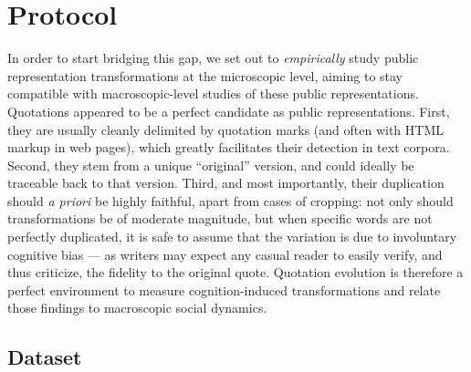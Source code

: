 \section{Protocol} %
\label{sec:protocol}

In order to start bridging this gap, we set out to \emph{empirically} study public representation transformations at the microscopic level, aiming to stay compatible with macroscopic-level studies of these public representations.
Quotations appeared to be a perfect candidate as public representations.
First, they are usually cleanly delimited by quotation marks (and often with HTML markup in web pages), which greatly facilitates their detection in text corpora.
Second, they stem from a unique ``original'' version, and could ideally be traceable back to that version.
Third, and most importantly, their duplication should \emph{a priori} be highly faithful, apart from cases of cropping: not only should transformations be of moderate magnitude, but when specific words are not perfectly duplicated, it is safe to assume that the variation is due to involuntary cognitive bias --- as writers may expect any casual reader to easily verify, and thus criticize, the fidelity to the original quote.
Quotation evolution is therefore a perfect environment to measure cognition-induced transformations and relate those findings to macroscopic social dynamics.

\subsection{Dataset}

